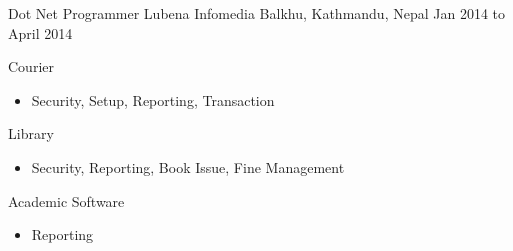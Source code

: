 \begin{cventries}
  \cventry
    {Dot Net Programmer} %
    {Lubena Infomedia} %
    {Balkhu, Kathmandu, Nepal} %
    {Jan 2014 to April 2014} %
    {
      \begin{cvitems} %
        \item {Courier}
        \begin{itemize}
        \item {Security, Setup, Reporting, Transaction}
        \end{itemize}
        \item {Library}
        \begin{itemize}
        \item {Security, Reporting, Book Issue, Fine Management}
        \end{itemize}
        \item {Academic Software}
        \begin{itemize}
        \item {Reporting}
        \end{itemize}
      \end{cvitems}
    }


\end{cventries}
